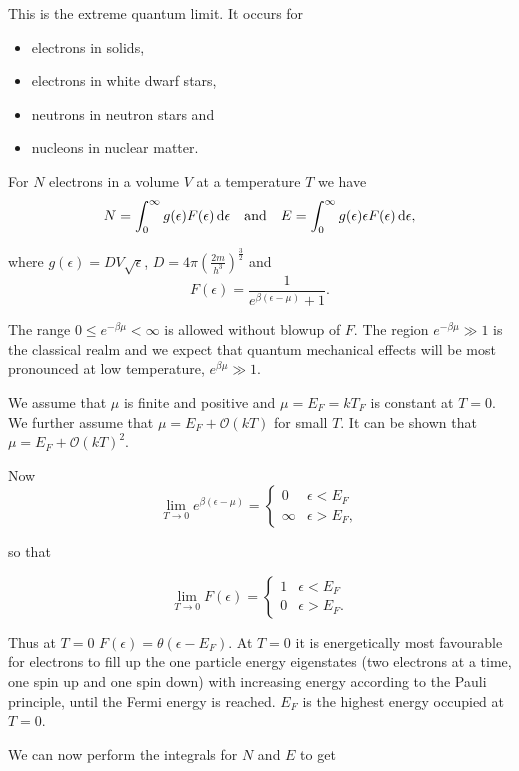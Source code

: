 \documentclass{notes}
\newcommand{\cO}{\mathcal{O}}
\begin{document}
This is the extreme quantum limit.  It occurs for

\begin{itemize}
\item electrons in solids,
\item electrons in white dwarf stars,
\item neutrons in neutron stars and
\item nucleons in nuclear matter.
\end{itemize}

For $N$ electrons in a volume $V$ at a temperature $T$ we have
\[
N = \int_0^\infty g(\epsilon) F(\epsilon)\, \mathrm{d} \epsilon \quad \text{and}
\quad
E = \int_0^\infty g(\epsilon) \epsilon F(\epsilon)\, \mathrm{d} \epsilon,
\]

where $g(\epsilon) = D V \sqrt{\epsilon}$, $D = 4 \pi
\left( \tfrac{2 m}{h^3} \right)^{\frac{3}{2}}$ and
\[
F(\epsilon) = \frac{1}{e^{\beta(\epsilon - \mu)} + 1}.
\]

The range $0 \le e^{-\beta \mu} < \infty$ is allowed without blowup
of $F$.   The region $e^{- \beta \mu} \gg 1$ is the classical realm
and we expect that quantum mechanical effects will be most pronounced
at low temperature, $e^{\beta \mu} \gg 1$.

We assume that $\mu$ is finite and positive and
$\mu = E_F = k T_F$ is constant at $T=0$.  We further assume
that $\mu = E_F + \cO(k T)$ for small $T$.  It can be shown that
$\mu = E_F + \cO(k T)^2$.

Now
\[
\lim_{T \to 0} e^{\beta(\epsilon - \mu)} =
\begin{cases}
0 & \epsilon < E_F \\
\infty & \epsilon > E_F,
\end{cases}
\]

so that

\[
\lim_{T \to 0} F(\epsilon) = \begin{cases}
1 & \epsilon < E_F \\
0 & \epsilon > E_F.
\end{cases}
\]

Thus at $T = 0$ $F(\epsilon) = \theta(\epsilon - E_F)$.  At $T = 0$
it is energetically most favourable for electrons to fill up the
one particle energy eigenstates (two electrons at a time, one spin up
and one spin down) with increasing energy according to the Pauli
principle, until the Fermi energy is reached.  $E_F$ is the highest
energy occupied at $T=0$.

We can now perform the integrals for $N$ and $E$ to get
\end{document}
